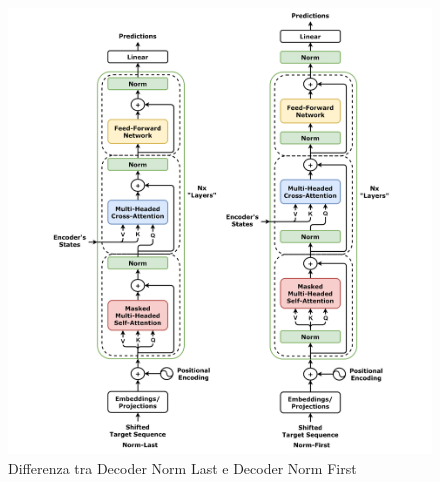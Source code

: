 \begin{figure}[!t]
\begin{minipage}{0.48\textwidth}
        \includegraphics[width=1.2\linewidth]{Images/cap1/Transformer_decoder,_with_norm-first_and_norm-last.png}
        \caption{Differenza tra Decoder Norm Last e Decoder Norm First}
        \label{fig:decoder}
    \end{minipage}
\end{figure}

